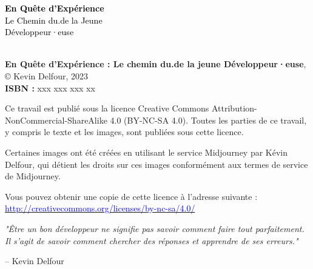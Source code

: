 \newpage{}
\thispagestyle {empty}
\begin{titlepage}
    \centering
    \vspace*{3cm}
    {\fontsize{35}{72} \selectfont \textcolor{black}{\textbf{En Quête d'Expérience}}}\\[0.5cm]
    {\fontsize{25}{72} \selectfont \textcolor{black}{Le Chemin du.de la Jeune}}\\[0.25cm]
    {\fontsize{25}{72} \selectfont \textcolor{black}{Développeur·euse}}\\[2cm]
    {\fontsize{12}{19.2} \textcolor{black}{\selectfont {Kevin Delfour}}}\\[3pt]
    \vfill
\end{titlepage}

\newpage{}
\thispagestyle {empty}
\vspace*{\fill}

\begin{flushleft}

    \textbf{En Quête d'Expérience : Le chemin du.de la jeune Développeur·euse}, © Kevin Delfour, 2023 \\[0.25cm]
    \textbf{ISBN : } xxx xxx xxx xx

    \noindent Ce travail est publié sous la licence Creative Commons Attribution-NonCommercial-ShareAlike 4.0 (BY-NC-SA 4.0). Toutes les parties de ce travail, y compris le texte et les images, sont publiées sous cette licence.

    Certaines images ont été créées en utilisant le service Midjourney par Kévin Delfour, qui détient les droits sur ces images conformément aux termes de service de Midjourney.

    \small{Vous pouvez obtenir une copie de cette licence à l'adresse suivante : \href{http://creativecommons.org/licenses/by-nc-sa/4.0/}{\textcolor{blue}{http://creativecommons.org/licenses/by-nc-sa/4.0/}}}

\end{flushleft}

\newpage{}
\thispagestyle {empty}

\vspace*{2cm}

\begin{center}
    \vspace*{\fill}
    \parbox{10cm}{
        \begin{center}
            \large{\selectfont
                \textit{"Être un bon développeur ne signifie pas savoir comment faire tout parfaitement. Il s'agit de savoir comment chercher des réponses et apprendre de ses erreurs."}
            }

            \vspace{.5cm}\hfill{-- Kevin Delfour}
        \end{center}
    }
    \vspace*{\fill}
\end{center}

\newpage
\thispagestyle{empty} %
\mbox{}

